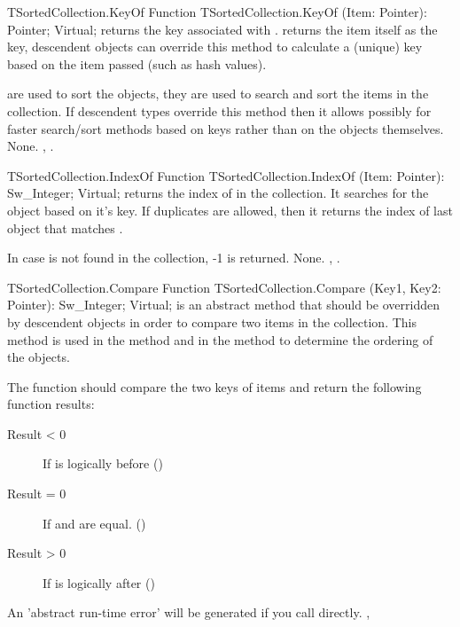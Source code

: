 \begin{function}{TSortedCollection.KeyOf}
\Declaration
Function TSortedCollection.KeyOf (Item: Pointer): Pointer; Virtual;
\Description
{} returns the key associated with .
 returns the item itself as the key, descendent
objects can override this method to calculate a (unique) key based on the
item passed (such as hash values).

 are used to sort the objects, they are used to search and sort
the items in the collection. If descendent types override this method then
it allows possibly for faster search/sort methods based on keys rather than
on the objects themselves.
\Errors
None.
\SeeAlso
{},
.
\end{function}

\begin{function}{TSortedCollection.IndexOf}
\Declaration
Function TSortedCollection.IndexOf (Item: Pointer): Sw\_Integer; Virtual;
\Description
{} returns the index of  in the collection. It searches
for the object based on it's key. If duplicates are allowed, then it returns 
the index of last object that matches .

In case  is not found in the collection, -1 is returned.
\Errors
None.
\SeeAlso
{},
.
\end{function}

\begin{function}{TSortedCollection.Compare}
\Declaration
Function TSortedCollection.Compare (Key1, Key2: Pointer): Sw\_Integer; Virtual;
\Description
{} is an abstract method that should be overridden by descendent
objects in order to compare two items in the collection. This method is used
in the  method and in the
 method to determine the ordering of
the objects.

The function should compare the two keys of items and return the following
function results:
\begin{description}
\item [Result < 0] If  is logically before 
()
\item [Result = 0] If  and  are equal. ()
\item [Result > 0] If  is logically after 
()
\end{description}
\Errors
An 'abstract run-time error' will be generated if you call
 directly.
\SeeAlso
{},
\end{function}

